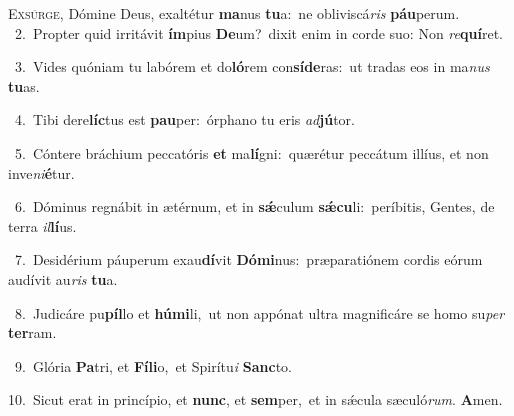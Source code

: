 \lettrine{\initial\textcolor{\initialcolor}{E}}{xsúrge,} Dómine Deus, exaltétur \textbf{ma}\-nus \textbf{tu}\-a:~\star ne obliviscá\textit{ris} \textbf{páu}\-perum.\\
{\numbfont\textcolor{\numbcolor}{~2.}}~Propter quid irritávit \textbf{ím}\-pius \textbf{De}\-um?~\star dixit enim in corde suo: Non \textit{re}\-\textbf{quí}ret.\par
{\numbfont\textcolor{\numbcolor}{~3.}}~Vides quóniam tu labórem et do\-\textbf{ló}\-rem con\-\textbf{sí}\-\textbf{de}ras:~\star ut tradas eos in ma\textit{nus} \textbf{tu}\-as.\par
{\numbfont\textcolor{\numbcolor}{~4.}}~Tibi dere\-\textbf{líc}\-tus est \textbf{pau}\-per:~\star órphano tu eris \textit{ad}\-\textbf{jú}tor.\par
{\numbfont\textcolor{\numbcolor}{~5.}}~Cóntere bráchium peccatóris \textbf{et} ma\-\textbf{lí}\-gni:~\star quærétur peccátum illíus, et non inve\-\textit{ni}\-\textbf{é}tur.\par
{\numbfont\textcolor{\numbcolor}{~6.}}~Dóminus regnábit in ætérnum, et in \textbf{sǽ}\-culum \textbf{sǽ}\-\textbf{cu}li:~\star períbitis, Gentes, de terra \textit{il}\-\textbf{lí}us.\par
{\numbfont\textcolor{\numbcolor}{~7.}}~Desidérium páuperum exau\-\textbf{dí}\-vit \textbf{Dó}\-\textbf{mi}nus:~\star præparatiónem cordis eórum audívit au\textit{ris} \textbf{tu}\-a.\par
{\numbfont\textcolor{\numbcolor}{~8.}}~Judicáre pu\-\textbf{píl}\-lo et \textbf{hú}\-\textbf{mi}li,~\star ut non appónat ultra magnificáre se homo su\textit{per} \textbf{ter}\-ram.\par
{\numbfont\textcolor{\numbcolor}{~9.}}~Glória \textbf{Pa}\-tri, et \textbf{Fí}\-\textbf{li}o,~\star et Spirítu\textit{i} \textbf{Sanc}\-to.\par
{\numbfont\textcolor{\numbcolor}{10.}}~Sicut erat in princípio, et \textbf{nunc}\-, et \textbf{sem}\-per,~\star et in sǽcula sæculó\-\textit{rum}\-. \textbf{A}\-men.\par
